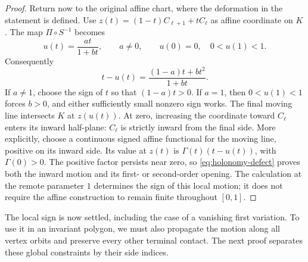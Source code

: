 \documentclass[11pt,a4paper]{article}
\theoremstyle{definition}
\theoremstyle{remark}
\numberwithin{equation}{section}
\begin{document}
\begin{proof}
Return now to the original affine chart, where the deformation in the
statement is defined.  Use $z(t)=(1-t)C_{\ell+1}+tC_\ell$ as affine
coordinate on $K$.  The map
$\Pi\circ S^{-1}$ becomes
\[
 u(t)=\frac{at}{1+bt},\qquad a\ne0,\qquad u(0)=0,\quad0<u(1)<1.
\]
Consequently
\begin{equation}\label{eq:holonomy-defect}
 t-u(t)=\frac{(1-a)t+bt^2}{1+bt}.
\end{equation}
If $a\ne1$, choose the sign of $t$ so that $(1-a)t>0$.  If $a=1$,
then $0<u(1)<1$ forces $b>0$, and either sufficiently small nonzero
sign works.  The final moving line intersects $K$ at $z(u(t))$.
At zero, increasing the coordinate toward $C_\ell$ enters its inward
half-plane: $C_\ell$ is strictly inward from the final side.  More
explicitly, choose a continuous signed affine functional for the moving
line, positive on its inward side.  Its value at $z(t)$ is
$\Gamma(t)(t-u(t))$, with $\Gamma(0)>0$.  The positive factor persists
near zero, so \eqref{eq:holonomy-defect} proves both the inward motion
and its first- or second-order opening.  The calculation at the remote
parameter $1$ determines the sign of this local motion; it does not
require the affine construction to remain finite throughout $[0,1]$.
\end{proof}

The local sign is now settled, including the case of a vanishing first
variation.  To use it in an invariant polygon, we must also propagate the
motion along all vertex orbits and preserve every other terminal contact.
The next proof separates these global constraints by their side indices.
\end{document}

